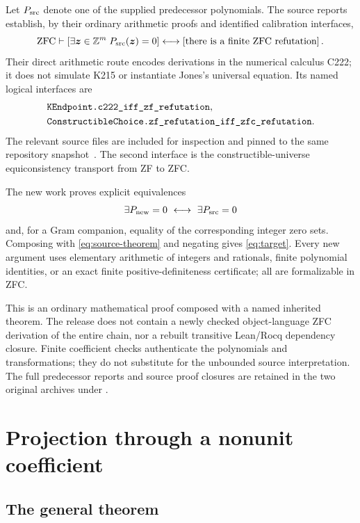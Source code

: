\documentclass[11pt]{article}
\theoremstyle{remark}\newtheorem{remark}[theorem]{Remark}
\newcommand{\Z}{\mathbb Z}
\newcommand{\ZFC}{\mathrm{ZFC}}
\newcommand{\code}[1]{\texttt{\detokenize{#1}}}
\begin{document}
Let $P_{\rm src}$ denote one of the supplied predecessor polynomials.
The source reports establish, by their ordinary arithmetic proofs and
identified calibration interfaces,
\begin{equation}\label{eq:source-theorem}
\ZFC\vdash
\left[\exists\boldsymbol z\in\Z^m\;P_{\rm src}(\boldsymbol z)=0\right]
\longleftrightarrow
\left[\text{there is a finite ZFC refutation}\right].
\end{equation}
Their direct arithmetic route encodes derivations in the numerical
calculus C222; it does not simulate K215 or instantiate Jones's universal
equation. Its named logical interfaces are
\begin{align*}
&\code{KEndpoint.c222_iff_zf_refutation},\\
&\code{ConstructibleChoice.zf_refutation_iff_zfc_refutation}.
\end{align*}
The relevant source files are included for inspection and pinned to the
same repository snapshot~\cite{endpoint,choice}. The second interface is
the constructible-universe equiconsistency transport from ZF to ZFC.

The new work proves explicit equivalences
\[
\exists P_{\rm new}=0\ \longleftrightarrow\ \exists P_{\rm src}=0
\]
and, for a Gram companion, equality of the corresponding integer zero
sets. Composing with \eqref{eq:source-theorem} and negating gives
\eqref{eq:target}. Every new argument uses elementary arithmetic of
integers and rationals, finite polynomial identities, or an exact finite
positive-definiteness certificate; all are formalizable in ZFC.

This is an ordinary mathematical proof composed with a named inherited
theorem. The release does not contain a newly checked object-language
ZFC derivation of the entire chain, nor a rebuilt transitive Lean/Rocq
dependency closure. Finite coefficient checks authenticate the
polynomials and transformations; they do not substitute for the
unbounded source interpretation. The full predecessor reports and source
proof closures are retained in the two original archives under
\code{sources/}.

\section{Projection through a nonunit coefficient}\label{sec:projection}

\subsection{The general theorem}
\end{document}
